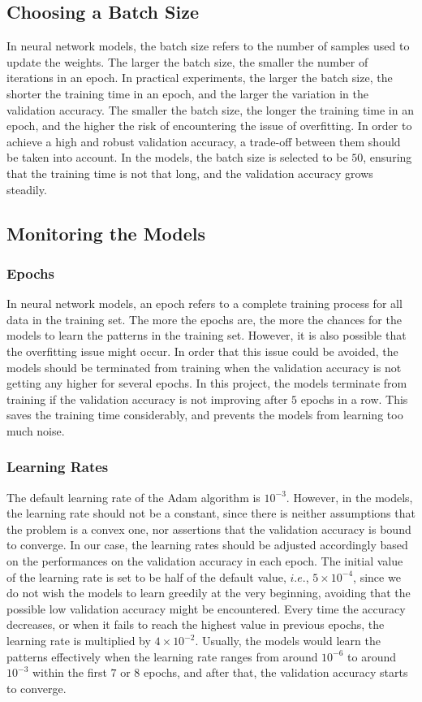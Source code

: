 \documentclass[11pt,twoside]{article}
\numberwithin{Theorem}{section}
\numberwithin{Definition}{section}
\numberwithin{Lemma}{section}
\numberwithin{Algorithm}{section}
\numberwithin{equation}{section}
\begin{document}
\subsection{Choosing a Batch Size}
In neural network models, the batch size refers to the number of samples used to update the weights. The larger the batch size, the smaller the number of iterations in an epoch. In practical experiments, the larger the batch size, the shorter the training time in an epoch, and the larger the variation in the validation accuracy. The smaller the batch size, the longer the training time in an epoch, and the higher the risk of encountering the issue of overfitting. In order to achieve a high and robust validation accuracy, a trade-off between them should be taken into account. In the models, the batch size is selected to be $50$, ensuring that the training time is not that long, and the validation accuracy grows steadily. 

\subsection{Monitoring the Models}
\subsubsection{Epochs}
In neural network models, an epoch refers to a complete training process for all data in the training set. The more the epochs are, the more the chances for the models to learn the patterns in the training set. However, it is also possible that the overfitting issue might occur. In order that this issue could be avoided, the models should be terminated from training when the validation accuracy is not getting any higher for several epochs. In this project, the models terminate from training if the validation accuracy is not improving after $5$ epochs in a row. This saves the training time considerably, and prevents the models from learning too much noise.

\subsubsection{Learning Rates}
The default learning rate of the Adam algorithm is $10^{-3}$. However, in the models, the learning rate should not be a constant, since there is neither assumptions that the problem is a convex one, nor assertions that the validation accuracy is bound to converge. In our case, the learning rates should be adjusted accordingly based on the performances on the validation accuracy in each epoch. The initial value of the learning rate is set to be half of the default value, $i.e.$, $5 \times 10^{-4}$, since we do not wish the models to learn greedily at the very beginning, avoiding that the possible low validation accuracy might be encountered. Every time the accuracy decreases, or when it fails to reach the highest value in previous epochs, the learning rate is multiplied by $4 \times 10 ^ {-2}$. Usually, the models would learn the patterns effectively when the learning rate ranges from around $10^{-6}$ to around $10^{-3}$ within the first $7$ or $8$ epochs, and after that, the validation accuracy starts to converge.
\end{document}
